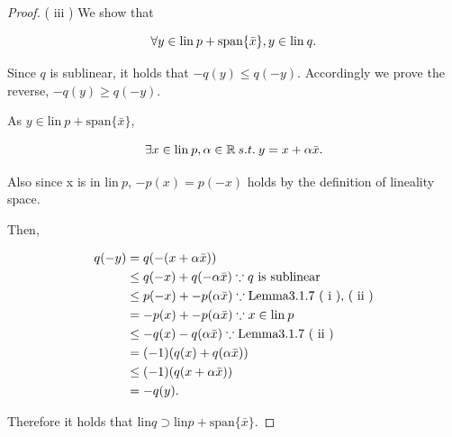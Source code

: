 \documentclass[a4paper,11pt]{jsarticle}
\begin{document}
\begin{proof}
  ( $\mathrm{iii}$ ) We show that

  \begin{equation}
    \forall y \in \text{lin}\:p + \text{span}\{\bar{x}\}, y \in \text{lin}\:q. \notag
  \end{equation}

  Since $q$ is sublinear, it holds that $-q(y) \leq q(-y)$. Accordingly we prove the reverse, $-q(y) \geq q(-y)$.

  As $y \in \text{lin}\:p + \text{span}\{\bar{x}\}$,

  \begin{equation}
    \exists x \in \text{lin}\:p, \alpha \in \mathbb{R} \:s.t.\: y=x+\alpha \bar{x}. \notag
  \end{equation}

  Also since x is in $\text{lin}\:p$, $-p(x)=p(-x)$ holds by the definition of lineality space.

  Then,

  \begin{equation}
    \begin{split}
      q(-y) &= q(-(x+\alpha \bar{x}))\\
      &\leq q(-x) + q(-\alpha \bar{x}) \because \text{$q$ is sublinear}\\
      &\leq p(-x) + -p(\alpha \bar{x}) \because \text{Lemma3.1.7 ( $\mathrm{i}$ ), ( $\mathrm{ii}$ )}\\
      &= -p(x) + -p(\alpha \bar{x}) \because \text{$x \in \text{lin}\:p$}\\
      &\leq -q(x) - q(\alpha \bar{x}) \because \text{Lemma3.1.7 ( $\mathrm{ii}$ )}\\
      &= (-1)(q(x)+q(\alpha \bar{x}))\\
      &\leq (-1)(q(x+\alpha \bar{x}))\\
      &= -q(y). \notag
    \end{split}
  \end{equation}

  Therefore it holds that $\text{lin}q \supset \text{lin}p + \text{span}\{\bar{x}\}$.

\end{proof}

\begin{center}
\end{center}
\end{document}
